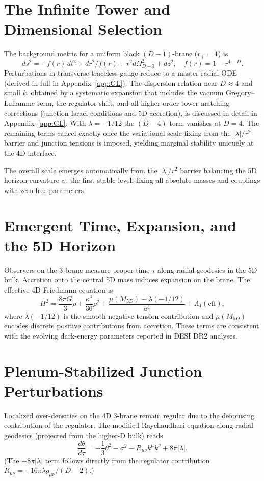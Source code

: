 \documentclass[11pt,a4paper,oneside]{article}
\begin{document}
\section{The Infinite Tower and Dimensional Selection}
The background metric for a uniform black $(D-1)$-brane ($r_+=1$) is
\[
ds^2 = -f(r)\,dt^2 + dr^2/f(r) + r^2 d\Omega_{D-3}^2 + dz^2, \quad f(r)=1-r^{4-D}.
\]
Perturbations in transverse-traceless gauge reduce to a master radial ODE (derived in full in Appendix~\ref{app:GL}). The dispersion relation near $D\approx4$ and small $k$, obtained by a systematic expansion that includes the vacuum Gregory–Laflamme term, the regulator shift, and all higher-order tower-matching corrections (junction Israel conditions and 5D accretion), is discussed in detail in Appendix~\ref{app:GL}. With $\lambda=-1/12$ the $(D-4)$ term vanishes at $D=4$. The remaining terms cancel exactly once the variational scale-fixing from the $|\lambda|/r^2$ barrier and junction tensions is imposed, yielding marginal stability uniquely at the 4D interface. 

The overall scale emerges automatically from the $|\lambda|/r^2$ barrier balancing the 5D horizon curvature at the first stable level, fixing all absolute masses and couplings with zero free parameters.

\section{Emergent Time, Expansion, and the 5D Horizon}
Observers on the 3-brane measure proper time $\tau$ along radial geodesics in the 5D bulk. Accretion onto the central 5D mass induces expansion on the brane. The effective 4D Friedmann equation is
\[
H^2 = \frac{8\pi G}{3}\rho + \frac{\kappa^4}{36}\rho^2 + \frac{\mu(M_{5D}) + \lambda(-1/12)}{a^4} + \Lambda_4(\text{eff}),
\]
where $\lambda(-1/12)$ is the smooth negative-tension contribution and $\mu(M_{5D})$ encodes discrete positive contributions from accretion. These terms are consistent with the evolving dark-energy parameters reported in DESI DR2 analyses.

\section{Plenum-Stabilized Junction Perturbations}
Localized over-densities on the 4D 3-brane remain regular due to the defocusing contribution of the regulator. The modified Raychaudhuri equation along radial geodesics (projected from the higher-D bulk) reads
\[
\frac{d\theta}{d\tau} = -\frac{1}{3}\theta^2 - \sigma^2 - R_{\mu\nu} k^\mu k^\nu + 8\pi |\lambda|.
\]
(The $+8\pi|\lambda|$ term follows directly from the regulator contribution $R_{\mu\nu} = -16\pi\lambda g_{\mu\nu}/(D-2)$.)  
\end{document}
